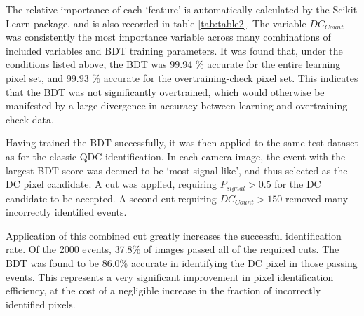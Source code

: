\documentclass[]{article}
\begin{document}
The relative importance of each \textquoteleft feature' is automatically calculated by the Scikit Learn package, and is also recorded in table \ref{tab:table2}. The variable $DC_{Count}$ was consistently the most importance variable across many combinations of included variables and BDT training parameters. It was found that, under the conditions listed above, the BDT was 99.94 \% accurate for the entire learning pixel set, and 99.93 \%  accurate for the overtraining-check pixel set. This indicates that the BDT was not significantly overtrained, which would otherwise be manifested by a large divergence in accuracy between learning and overtraining-check data.

Having trained the BDT successfully, it was then applied to the same test dataset as for the classic QDC identification. In each camera image, the event with the largest BDT score was deemed to be \textquoteleft most signal-like', and thus selected as the DC pixel candidate. A cut was applied, requiring $P_{signal} > 0.5$ for the DC candidate to be accepted. A second cut requiring $DC_{Count} > 150$ removed many incorrectly identified events. 

Application of this combined cut greatly increases the successful identification rate. Of the 2000 events, 37.8\% of images passed all of the required cuts. The BDT was found to be 86.0\% accurate in identifying the DC pixel in those passing events. This represents a very significant improvement in pixel identification efficiency, at the cost of a negligible increase in the fraction of incorrectly identified pixels.
\end{document}

